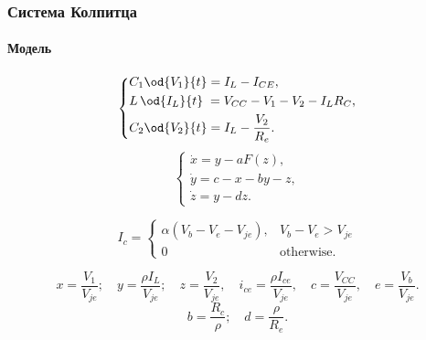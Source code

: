 \documentclass[10pt,utf8]{beamer}
\newlength\TW
\begin{document}
\begin{frame}
  \frametitle{Система Колпитца}
  \framesubtitle{Модель}

    \begin{equation}
    \label{atu:eq:colp_phys}
    \begin{dcases}
      C_1 \od{V_{1}}{t}  = I_L - I_{CE} , \\
      L\, \od{I_L}{t} \; = V_{CC} - V_{1} - V_{2} - I_L R_C , \\
      C_2 \od{V_{2}}{t}  = I_L - \frac{V_{2}}{R_e}.
    \end{dcases}
    \end{equation}
    \begin{equation}
    \label{atu:eq:colp}
    \begin{cases}
      \dot{x} = y - a F(z), \\
      \dot{y} = c - x - by - z, \\
      \dot{z} = y - d z.
    \end{cases}
    \end{equation}

    \begin{equation}
    I_c =
      \begin{cases}
        \alpha ( V_b - V_e - V_{je} ), & V_b - V_e > V_{je} \\
        0                              & \text{otherwise}.
      \end{cases}
      \label{atu:eq:bjt_libear_model}
    \end{equation}

\[
  x = \frac{V_{1}}{V_{je}} ; \quad
  y = \frac{\rho I_L}{V_{je}} ; \quad
  z = \frac{V_{2}}{V_{je}}, \quad
  i_{ce} = \frac{\rho I_{ce}}{V_{je}}, \quad
  c = \frac{V_{CC}}{V_{je}}, \quad
  e = \frac{V_{b}}{V_{je}}.
\]
%
\[
  b = \frac{R_c}{\rho}; \quad
  d = \frac{\rho}{R_e}. %
\]

\end{frame}



\end{document}
